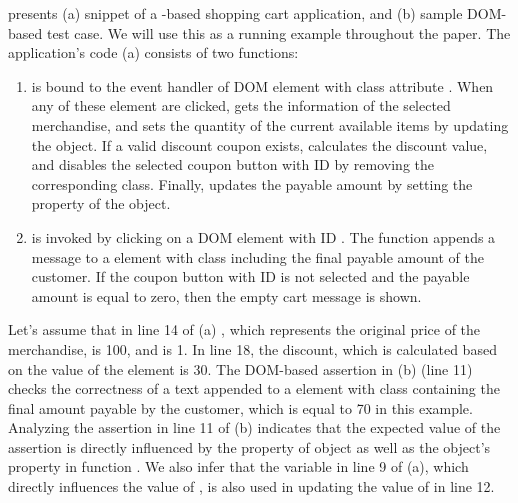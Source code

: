  presents (a) snippet of a \javascript-based shopping cart application, and (b) sample DOM-based \selenium test case.  We will use this as a running example throughout the paper. The application's code (a) consists of two functions:
\begin{enumerate}

\item {} is bound to the event handler of DOM element with class attribute . When any of these element are clicked,  gets the information of the selected merchandise, and sets the quantity of the current available items by updating the  object. If a valid discount coupon exists,  calculates the discount value, and disables the selected  coupon button with ID  by removing the corresponding class. 
Finally,  updates the payable amount by setting the  property of the  object.

\item {} is invoked by clicking on a DOM element with ID . The function appends a message to a  element with class  including the final payable amount of the customer. If the  coupon button with ID  is not selected and the payable amount is equal to zero, then the empty cart message is shown.    

\end{enumerate}
Let's assume that in line 14 of (a) , which represents the original price of the merchandise, is 100, and  is 1. In line 18, the discount, which is calculated based on the  value of the  element is 30. 
The DOM-based assertion in (b) (line 11) checks the correctness of a text appended to a  element with class  containing the final amount payable by the customer, which is equal to 70 in this example.
Analyzing the assertion in line 11 of (b) indicates that the expected value of the assertion is directly influenced by the  property of  object as well as the object's property  in function . We also infer that the  variable in line 9 of (a), which directly influences the value of , is also used in updating the value of  in line 12.

